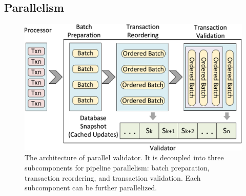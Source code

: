 

\subsection{Parallelism}
\label{sec:parallel}
\label{sec:validator_reordering:parallel}

\begin{figure}[t]
	\centering
	\includegraphics[width=.9\columnwidth]{./figures/validator}
	\caption{The architecture of parallel validator. It is decoupled into three subcomponents for pipeline parallelism: batch preparation, transaction reordering, and transaction validation. Each subcomponent can be further parallelized.}
	\label{fig:reorder:validator}
\end{figure}

